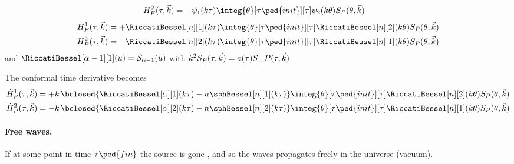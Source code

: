 \begin{draft}
{\begin{align}
        H_P^2(\tau, \vec{k}) &= -\psi_1(k\tau) \integ{\theta}[\tau\ped{init}][\tau]  \psi_2(k\theta) \Src_P(\theta, \vec{k})
    \end{align}
    \begin{align}
        H_P^1(\tau, \vec{k}) &= +\RiccatiBessel[n][1](k\tau) \integ{\theta}[\tau\ped{init}][\tau]  \RiccatiBessel[n][2](k\theta)  \Src_P(\theta, \vec{k}) \\
        H_P^2(\tau, \vec{k}) &= -\RiccatiBessel[n][2](k\tau) \integ{\theta}[\tau\ped{init}][\tau]  \RiccatiBessel[n][1](k\theta) \Src_P(\theta, \vec{k})
    \end{align}
    and $\RiccatiBessel[\alpha-1][1](u) = \mathcal{S}_{\alpha-1}(u) $
    with $k^2S_P(\tau, \vec{k}) = a(\tau) S\_P(\tau, \vec{k})$.
    


    The conformal time derivative becomes
    \begin{equation}
        \begin{split}
            \dot{H}_P^1(\tau, \vec{k})  &= +k \,\bclosed{ \RiccatiBessel[\alpha][1](k\tau) -  n\sphBessel[n][1](k\tau) } \integ{\theta}[\tau\ped{init}][\tau]  \RiccatiBessel[n][2](k\theta)  \Src_P(\theta, \vec{k})  \\
            \dot{H}_P^2(\tau, \vec{k})  &= -k \,\bclosed{ \RiccatiBessel[\alpha][2](k\tau) -  n\sphBessel[n][2](k\tau) } \integ{\theta}[\tau\ped{init}][\tau]  \RiccatiBessel[n][1](k\theta)  \Src_P(\theta, \vec{k})  
        \end{split}
    \end{equation}

    \paragraph{Free waves.} %
    If at some point in time $\tau\ped{fin}$ the source is gone \blahblah, and so the waves propagates freely in the universe (vacuum).
        }
\end{draft}






